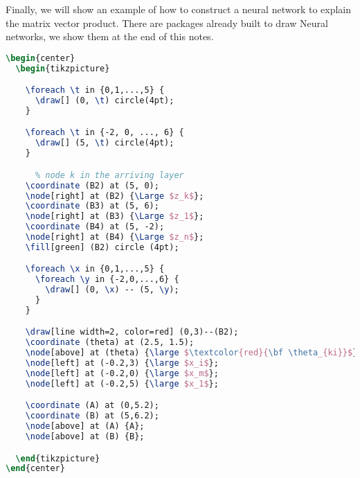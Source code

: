 \documentclass[12pt]{article}
\begin{document}
\vspace{1in}
Finally, we will show an example of how to construct a neural network to explain the
matrix vector product. There are packages already built to draw Neural networks, we show
them at the end of this notes.

\small
\begin{lstlisting}[language=tex]
\begin{center}
  \begin{tikzpicture}

    \foreach \t in {0,1,...,5} {
      \draw[] (0, \t) circle(4pt);
    }

    \foreach \t in {-2, 0, ..., 6} {
      \draw[] (5, \t) circle(4pt);
    }

      % node k in the arriving layer
    \coordinate (B2) at (5, 0);
    \node[right] at (B2) {\Large $z_k$};
    \coordinate (B3) at (5, 6);
    \node[right] at (B3) {\Large $z_1$};
    \coordinate (B4) at (5, -2);
    \node[right] at (B4) {\Large $z_n$};
    \fill[green] (B2) circle (4pt);

    \foreach \x in {0,1,...,5} {
      \foreach \y in {-2,0,...,6} {
        \draw[] (0, \x) -- (5, \y);
      }
    }

    \draw[line width=2, color=red] (0,3)--(B2);
    \coordinate (theta) at (2.5, 1.5);
    \node[above] at (theta) {\large $\textcolor{red}{\bf \theta_{ki}}$};
    \node[left] at (-0.2,3) {\large $x_i$};
    \node[left] at (-0.2,0) {\large $x_m$};
    \node[left] at (-0.2,5) {\large $x_1$};

    \coordinate (A) at (0,5.2);
    \coordinate (B) at (5,6.2);
    \node[above] at (A) {A};
    \node[above] at (B) {B};

  \end{tikzpicture}
\end{center}
\end{lstlisting}
\normalsize
\end{document}
